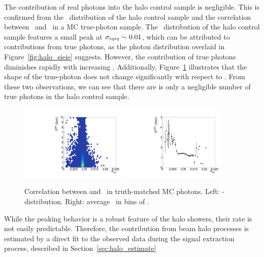 The contribution of real photons into the halo control sample is negligible.
This is confirmed from the \sieie\ distribution of the halo control sample and the correlation between \sieie\ and \emip\ in a MC true-photon sample.
The \sieie\ distribution of the halo control sample features a small peak at $\sigma_{i\eta i\eta} \sim 0.01$, which can be attributed to contributions from true photons, as the photon \sieie distribution overlaid in Figure~\ref{fig:halo_sieie} suggests. 
However, the contribution of true photons diminishes rapidly with increasing \sieie. 
Additionally, Figure~\ref{fig:sieie_mip_corr} illustrates that the shape of the true-photon \sieie does not change significantly with respect to \emip. 
From these two observations, we can see that there are is only a negligible number of true photons in the halo control sample.

\begin{figure}[tbp]
  \begin{center}
    \includegraphics[width=0.45\textwidth]{Reconstruction/Figures/halo/sieie_mip_corr.pdf}
    \includegraphics[width=0.45\textwidth]{Reconstruction/Figures/halo/sieie_mip_prof.pdf}
    \caption{
      Correlation between \sieie and \emip\ in truth-matched MC photons. 
      Left: \emip-\sieie distribution.
      Right: average \emip\ in bins of \sieie.
    }
    \label{fig:sieie_mip_corr}
  \end{center}
\end{figure}

While the peaking behavior is a robust feature of the halo showers, their rate is not easily predictable. 
Therefore, the contribution from beam halo processes is estimated by a direct fit to the observed data during the signal extraction process, described in Section~\ref{sec:halo_estimate}

